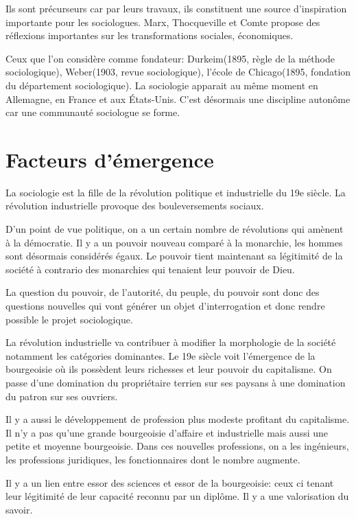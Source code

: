 \documentclass[10pt, a4paper, openany]{book}
\begin{document}
Ils sont précurseurs car par leurs travaux, ils constituent une source d'inspiration importante pour les sociologues. Marx, Thocqueville et Comte propose des réflexions importantes sur les transformations sociales, économiques.

Ceux que l'on considère comme fondateur: Durkeim(1895, règle de la méthode sociologique), Weber(1903, revue sociologique), l'école de Chicago(1895, fondation du département sociologique). La sociologie apparait au même moment en Allemagne, en France et aux États-Unis. C'est désormais une discipline autonôme car une communauté sociologue se forme.

\section{Facteurs d'émergence}

La sociologie est la fille de la révolution politique et industrielle du 19e siècle. La révolution industrielle provoque des bouleversements sociaux.

D'un point de vue politique, on a un certain nombre de révolutions qui amènent à la démocratie. Il y a un pouvoir nouveau comparé à la monarchie, les hommes sont désormais considérés égaux. Le pouvoir tient maintenant sa légitimité de la société à contrario des monarchies qui tenaient leur pouvoir de Dieu.

La question du pouvoir, de l'autorité, du peuple, du pouvoir sont donc des questions nouvelles qui vont générer un objet d'interrogation et donc rendre possible le projet sociologique.

La révolution industrielle va contribuer à modifier la morphologie de la société notamment les catégories dominantes. Le 19e siècle voit l'émergence de la bourgeoisie où ils possèdent leurs richesses et leur pouvoir du capitalisme. On passe d'une domination du propriétaire terrien sur ses paysans à une domination du patron sur ses ouvriers. 

Il y a aussi le développement de profession plus modeste profitant du capitalisme. Il n'y a pas qu'une grande bourgeoisie d'affaire et industrielle mais aussi une petite et moyenne bourgeoisie. Dans ces nouvelles professions, on a les ingénieurs, les professions juridiques, les fonctionnaires dont le nombre augmente.

Il y a un lien entre essor des sciences et essor de la bourgeoisie: ceux ci tenant leur légitimité de leur capacité reconnu par un diplôme. Il y a une valorisation du savoir.
\end{document}
